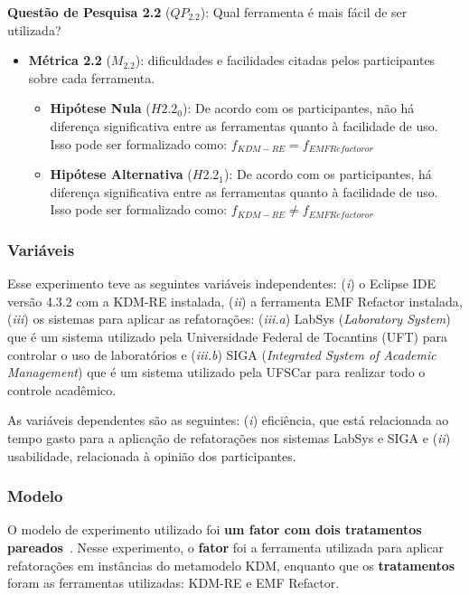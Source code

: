 \textbf{Questão de Pesquisa 2.2} (\textbf{$QP_{2.2}$}): Qual ferramenta é mais fácil de ser utilizada?

\begin{itemize}
\item \textbf{Métrica 2.2} (\textbf{$M_{2.2}$}): dificuldades e facilidades citadas pelos participantes sobre cada ferramenta.
\begin{itemize}
\item \textbf{Hipótese Nula} (\textbf{$H2.2_0$}): De acordo com os participantes, não há diferença significativa entre as ferramentas quanto à facilidade de uso. Isso pode ser formalizado como: $f_{KDM-RE} = f_{EMF Refactoror}$ 

\item \textbf{Hipótese Alternativa} (\textbf{$H2.2_1$}): De acordo com os participantes, há diferença significativa entre as ferramentas quanto à facilidade de uso. Isso pode ser formalizado como: $f_{KDM-RE} \neq f_{EMF Refactoror}$
\end{itemize}
\end{itemize}

\subsubsection{Variáveis}

Esse experimento teve as seguintes variáveis independentes: (\textit{i}) o Eclipse IDE versão 4.3.2 com a KDM-RE instalada, (\textit{ii}) a ferramenta EMF Refactor instalada, (\textit{iii}) os sistemas para aplicar as refatorações: (\textit{iii.a}) LabSys (\textit{Laboratory System}) que é um sistema utilizado pela Universidade Federal de Tocantins (UFT) para controlar o uso de laboratórios e (\textit{iii.b}) SIGA (\textit{Integrated System of Academic Management}) que é um sistema utilizado pela UFSCar para realizar todo o controle acadêmico.

As variáveis dependentes são as seguintes: (\textit{i}) eficiência, que está relacionada ao tempo gasto para a aplicação de refatorações nos sistemas LabSys e SIGA e (\textit{ii}) usabilidade, relacionada à opinião dos participantes.

\subsubsection{Modelo}
 
O modelo de experimento utilizado foi \textbf{um fator com dois tratamentos pareados}~\cite{Wohlin}. Nesse experimento, o \textbf{fator} foi a ferramenta utilizada para aplicar refatorações em instâncias do metamodelo KDM, enquanto que os \textbf{tratamentos} foram as ferramentas utilizadas: KDM-RE e EMF Refactor. 


